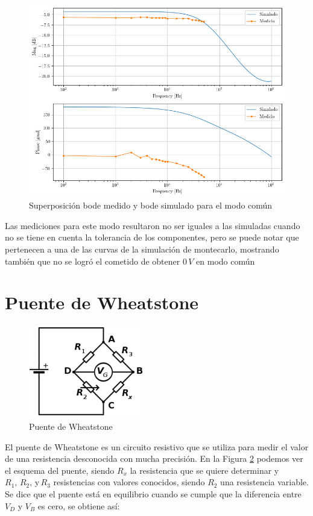 \documentclass[11pt, a4paper]{article}
\begin{document}
\begin{figure}[H]
\centering
\includegraphics[scale=0.6]{Bode-COMun.png}
\caption{Superposición bode medido y bode simulado para el modo común}
\label{fig:bodemedidocomun}
\end{figure}

	Las mediciones para este modo resultaron no ser iguales a las simuladas cuando no se tiene en cuenta la tolerancia de los componentes, pero se puede notar que pertenecen a una de las curvas de la simulación de montecarlo, mostrando también que no se logró el cometido de obtener $0 \, V$ en modo común
	
\section{Puente de Wheatstone}

\begin{figure}[H]
\centering
\includegraphics[scale=0.6]{puente.png}
\caption{Puente de Wheatstone}
\label{fig:puente}
\end{figure}

	El puente de Wheatstone es un circuito resistivo que se utiliza para medir el valor de una resistencia desconocida con mucha precisión.
	En la Figura \ref{fig:puente} podemos ver el esquema del puente, siendo $R_x$ la resistencia que se quiere determinar y $R_1, \, R_2, \, \text{y} \, R_3$ resistencias con valores conocidos, siendo $R_2$ una resistencia variable. Se dice que el puente está en equilibrio cuando se cumple que la diferencia entre $V_D$ y $V_B$ es cero, se obtiene así:
	
\end{document}
